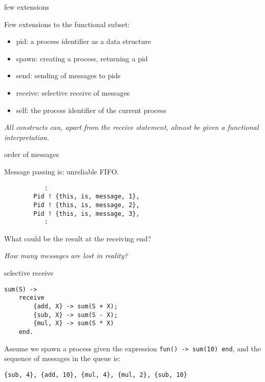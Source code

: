 \begin{frame}{few extensions}

Few extensions to the functional subset:
\pause\vspace{10pt}
\begin{itemize}
\pause\item pid: a process identifier as a data structure
\pause\item spawn: creating a process, returning a pid
\pause\item send: sending of messages to pids
\pause\item receive: selective receive of messages
\pause\item self: the process identifier of the current process
\end{itemize}

\pause\vspace{10pt}
{\em All constructs can, apart from the receive statement, almost be given a functional interpretation.}

\end{frame}

\begin{frame}[fragile]{order of messages}

Message passing is: unreliable FIFO.

\pause\vspace{10pt}
\begin{verbatim}
           :
        Pid ! {this, is, message, 1},
        Pid ! {this, is, message, 2},
        Pid ! {this, is, message, 3},
           :
\end{verbatim}

\pause What could be the result at the receiving end?

\pause\vspace{10pt}
{\em How many messages are lost in reality?} 

\end{frame}


\begin{frame}[fragile]{selective receive}

\begin{verbatim}
sum(S) ->
    receive 
        {add, X} -> sum(S + X);
        {sub, X} -> sum(S - X);
        {mul, X} -> sum(S * X)
    end.
\end{verbatim}

\pause\vspace{10pt}

Assume we spawn a process given the expression {\tt fun() -> sum(10) end}, \pause and the sequence of messages in the queue is:

\vspace{10pt}
{\tt \{sub, 4\}, \{add, 10\}, \{mul, 4\}, \{mul, 2\}, \{sub, 10\}}

\end{frame}



